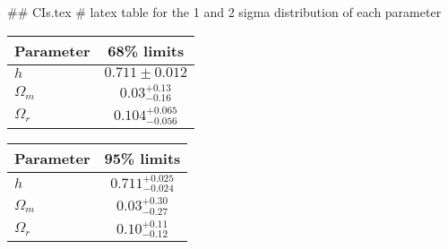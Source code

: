 ## CIs.tex
# latex table for the 1 and 2 sigma distribution of each parameter

\begin{tabular} { l  c}
 Parameter &  68\% limits\\
\hline
{\boldmath$h              $} & $0.711\pm 0.012            $\\
{\boldmath$\Omega_m       $} & $0.03^{+0.13}_{-0.16}      $\\
{\boldmath$\Omega_r       $} & $0.104^{+0.065}_{-0.056}   $\\
\hline
\end{tabular}

\begin{tabular} { l  c}
 Parameter &  95\% limits\\
\hline
{\boldmath$h              $} & $0.711^{+0.025}_{-0.024}   $\\
{\boldmath$\Omega_m       $} & $0.03^{+0.30}_{-0.27}      $\\
{\boldmath$\Omega_r       $} & $0.10^{+0.11}_{-0.12}      $\\
\hline
\end{tabular}
